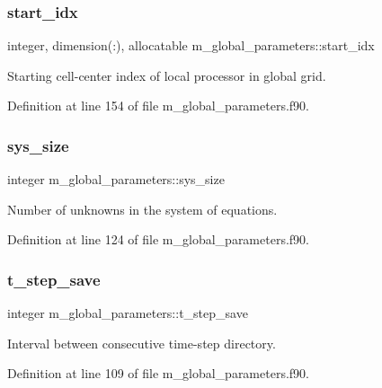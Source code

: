 \subsubsection{\texorpdfstring{start\+\_\+idx}{start\_idx}}
{\footnotesize\ttfamily integer, dimension(\+:), allocatable m\+\_\+global\+\_\+parameters\+::start\+\_\+idx}



Starting cell-\/center index of local processor in global grid. 



Definition at line 154 of file m\+\_\+global\+\_\+parameters.\+f90.

\mbox{\label{namespacem__global__parameters_a4dac2e4ead915635e0c6c33af87be01b}} 
\subsubsection{\texorpdfstring{sys\+\_\+size}{sys\_size}}
{\footnotesize\ttfamily integer m\+\_\+global\+\_\+parameters\+::sys\+\_\+size}



Number of unknowns in the system of equations. 



Definition at line 124 of file m\+\_\+global\+\_\+parameters.\+f90.

\mbox{\label{namespacem__global__parameters_a98b51eda2c46660b439c0a8375385165}} 
\subsubsection{\texorpdfstring{t\+\_\+step\+\_\+save}{t\_step\_save}}
{\footnotesize\ttfamily integer m\+\_\+global\+\_\+parameters\+::t\+\_\+step\+\_\+save}



Interval between consecutive time-\/step directory. 



Definition at line 109 of file m\+\_\+global\+\_\+parameters.\+f90.

